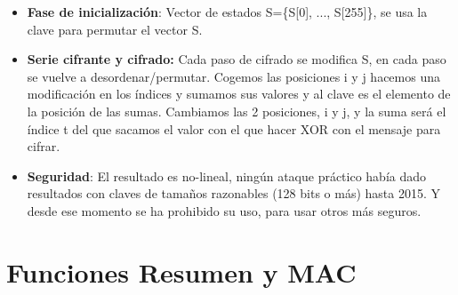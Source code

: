 \documentclass[12pt, twoside, openright]{report} %
\begin{document}
\begin{itemize}
\begin{itemize}
      \begin{itemize}
      \item \textbf{Fase de inicialización}: Vector de estados S=\{S{[}0{]},
        ..., S{[}255{]}\}, se usa la clave para permutar el vector S.
        
      \item \textbf{Serie cifrante y cifrado:} Cada paso de cifrado se
        modifica S, en cada paso se vuelve a desordenar/permutar.
        Cogemos las posiciones i y j hacemos una modificación en los
        índices y sumamos sus valores y al clave es el elemento de la
        posición de las sumas. Cambiamos las 2 posiciones, i y j, y la
        suma será el índice t del que sacamos el valor con el que hacer
        XOR con el mensaje para cifrar.
        
      \item \textbf{Seguridad}: El resultado es no-lineal, ningún ataque
        práctico había dado resultados con claves de tamaños razonables
        (128 bits o más) hasta 2015. Y desde ese momento se ha prohibido
        su uso, para usar otros más seguros.
        
      \end{itemize}
    \end{itemize}
  \end{itemize}



  
  \section{Funciones Resumen y MAC}
  
\end{document}
